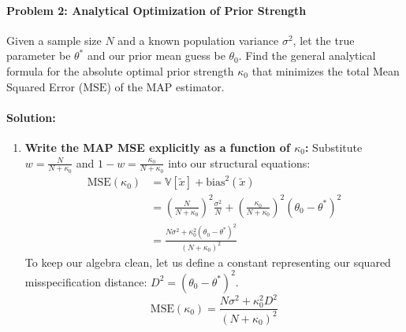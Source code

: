 \documentclass{article}
\begin{document}
\paragraph{Problem 2: Analytical Optimization of Prior Strength}
Given a sample size $N$ and a known population variance $\sigma^2$, let the true parameter be $\theta^*$ and our prior mean guess be $\theta_0$. Find the general analytical formula for the absolute optimal prior strength $\kappa_0$ that minimizes the total Mean Squared Error ($\text{MSE}$) of the MAP estimator.

\paragraph{Solution:}
\begin{enumerate}
    \item \textbf{Write the MAP MSE explicitly as a function of $\kappa_0$:}
    Substitute $w = \frac{N}{N+\kappa_0}$ and $1-w = \frac{\kappa_0}{N+\kappa_0}$ into our structural equations:
    \begin{align}
    \text{MSE}(\kappa_0) &= \mathbb{V}[\tilde{x}] + \text{bias}^2(\tilde{x}) \\
    &= \left(\frac{N}{N + \kappa_0}\right)^2 \frac{\sigma^2}{N} + \left(\frac{\kappa_0}{N + \kappa_0}\right)^2 (\theta_0 - \theta^*)^2 \\
    &= \frac{N\sigma^2 + \kappa_0^2(\theta_0 - \theta^*)^2}{(N + \kappa_0)^2}
    \end{align}
    To keep our algebra clean, let us define a constant representing our squared misspecification distance: $D^2 = (\theta_0 - \theta^*)^2$.
    \begin{equation}
    \text{MSE}(\kappa_0) = \frac{N\sigma^2 + \kappa_0^2 D^2}{(N + \kappa_0)^2}
    \end{equation}
    

\end{enumerate}
\end{document}

